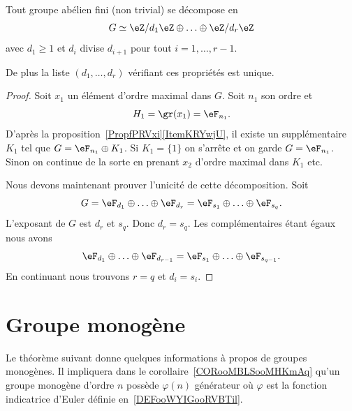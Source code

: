 \begin{theorem} \label{ThoRJWVJd}
    Tout groupe abélien fini (non trivial) se décompose en
    \begin{equation}
        G\simeq \eZ/d_1\eZ\oplus\ldots\oplus \eZ/d_r\eZ
    \end{equation}
    avec \( d_1\geq 1\) et \( d_i\) divise \( d_{i+1}\) pour tout \( i=1,\ldots, r-1\).

    De plus la liste \( (d_1,\ldots, d_r)\) vérifiant ces propriétés est unique.
\end{theorem}

\begin{proof}
    Soit \( x_1\) un élément d'ordre maximal dans \( G\). Soit \( n_1\) son ordre et
    \begin{equation}
        H_1=\gr(x_1)=\eF_{n_1}.
    \end{equation}
    D'après la proposition~\ref{PropfPRVxi}\ref{ItemKRYwjU}, il existe un supplémentaire \( K_1\) tel que \( G=\eF_{n_1}\oplus K_1\). Si \( K_1=\{ 1 \}\) on s'arrête et on garde \( G=\eF_{n_1}\). Sinon on continue de la sorte en prenant \( x_2\) d'ordre maximal dans \( K_1\) etc.

    Nous devons maintenant prouver l'unicité de cette décomposition. Soit
    \begin{equation}
        G=\eF_{d_1}\oplus\ldots\oplus \eF_{d_r}=\eF_{s_1}\oplus\ldots\oplus \eF_{s_q}.
    \end{equation}
    L'exposant de \( G\) est \( d_r\) et \( s_q\). Donc \( d_r=s_q\). Les complémentaires étant égaux nous avons
    \begin{equation}
        \eF_{d_1}\oplus\ldots\oplus \eF_{d_{r-1}}=\eF_{s_1}\oplus\ldots\oplus \eF_{s_{q-1}}.
    \end{equation}
    En continuant nous trouvons \( r=q\) et \( d_i=s_i\).
\end{proof}

\section{Groupe monogène}
\label{SECooXIHPooWVSjhT}

Le théorème suivant donne quelques informations à propos de groupes monogènes. Il impliquera dans le corollaire~\ref{CORooMBLSooMHKmAq} qu'un groupe monogène d'ordre \( n\) possède \( \varphi(n)\) générateur où \( \varphi\) est la fonction indicatrice d'Euler définie en~\ref{DEFooWYIGooRVBTil}.


